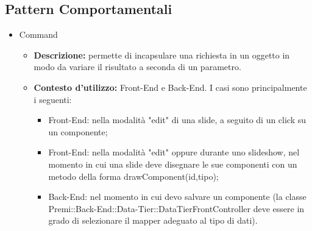 \subsection{Pattern Comportamentali}
\begin{itemize}
	\item Command
	\begin{itemize}
		\item \textbf{Descrizione:} permette di incapsulare una richiesta in un oggetto in modo da variare il risultato a seconda di un parametro.
		\item \textbf{Contesto d'utilizzo:} \gls{Front-End} e \gls{Back-End}. I casi sono principalmente i seguenti:
		\begin{itemize}
			\item \gls{Front-End}: nella modalità "edit" di una \gls{slide}, a seguito di un click su un componente;
			\item \gls{Front-End}: nella modalità "edit" oppure durante uno slideshow, nel momento in cui una \gls{slide} deve disegnare le sue componenti con un metodo della forma drawComponent(id,tipo);
			\item \gls{Back-End}: nel momento in cui devo salvare un componente (la classe Premi::\gls{Back-End}::Data-Tier::DataTierFrontController deve essere in grado di selezionare il mapper adeguato al tipo di dati).
		\end{itemize}
	\end{itemize}
\end{itemize}


